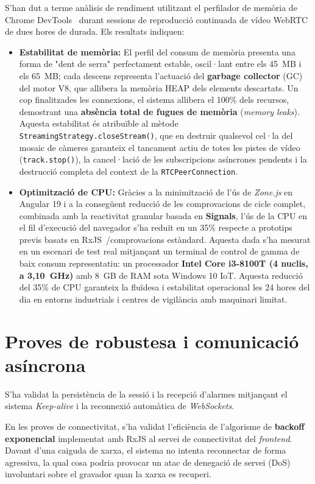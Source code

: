 S'han dut a terme anàlisis de rendiment utilitzant el perfilador de memòria de Chrome DevTools~\cite{chrome_devtools} durant sessions de reproducció continuada de vídeo WebRTC de dues hores de durada. Els resultats indiquen:
\begin{itemize}
    \item \textbf{Estabilitat de memòria:} El perfil del consum de memòria presenta una forma de "dent de serra" perfectament estable, oscil·lant entre els 45~MB i els 65~MB; cada descens representa l'actuació del \textbf{garbage collector} (GC) del motor V8, que allibera la memòria HEAP dels elements descartats. Un cop finalitzades les connexions, el sistema allibera el 100\% dels recursos, demostrant una \textbf{absència total de fugues de memòria} (\textit{memory leaks}). Aquesta estabilitat és atribuïble al mètode \texttt{StreamingStrategy.\allowbreak{}closeStream()}, que en destruir qualsevol cel·la del mosaic de càmeres garanteix el tancament actiu de totes les pistes de vídeo (\texttt{track.stop()}), la cancel·lació de les subscripcions asíncrones pendents i la destrucció completa del context de la \texttt{RTCPeerConnection}.
    \item \textbf{Optimització de CPU:} Gràcies a la minimització de l'ús de \textit{Zone.js} en Angular 19 i a la consegüent reducció de les comprovacions de cicle complet, combinada amb la reactivitat granular basada en \textbf{Signals}, l'ús de la CPU en el fil d'execució del navegador s'ha reduït en un 35\% respecte a prototips previs basats en RxJS~\cite{rxjs_docs}/comprovacions estàndard. Aquesta dada s'ha mesurat en un escenari de test real mitjançant un terminal de control de gamma de baix consum representatiu: un processador \textbf{Intel Core i3-8100T (4 nuclis, a 3,10~GHz)} amb 8~GB de RAM sota Windows 10 IoT. Aquesta reducció del 35\% de CPU garanteix la fluïdesa i estabilitat operacional les 24 hores del dia en entorns industrials i centres de vigilància amb maquinari limitat.
\end{itemize}

\section{Proves de robustesa i comunicació asíncrona}
S'ha validat la persistència de la sessió i la recepció d'alarmes mitjançant el sistema \textit{Keep-alive} i la reconnexió automàtica de \textit{WebSockets}.

En les proves de connectivitat, s'ha validat l'eficiència de l'algorisme de \textbf{backoff exponencial} implementat amb RxJS al servei de connectivitat del \textit{frontend}. Davant d'una caiguda de xarxa, el sistema no intenta reconnectar de forma agressiva, la qual cosa podria provocar un atac de denegació de servei (DoS) involuntari sobre el gravador quan la xarxa es recuperi. 


